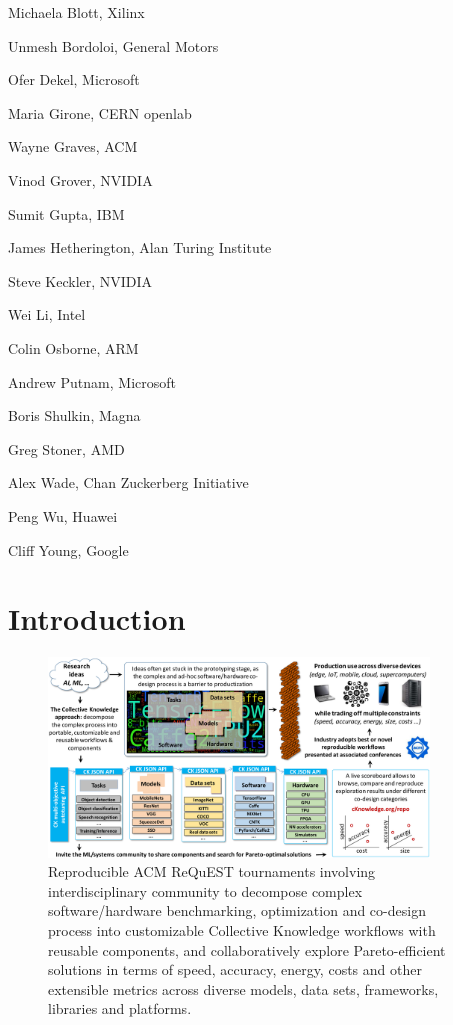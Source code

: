 \documentclass[10pt,onecolumn]{article}
\newenvironment{packed_itemize}{
\begin{itemize}
  \setlength{\itemsep}{1pt}
  \setlength{\parskip}{0pt}
  \setlength{\parsep}{0pt}
}{\end{itemize}}
\begin{document}
\begin{packed_itemize}

 \item Michaela Blott, Xilinx
 \item Unmesh Bordoloi, General Motors
 \item Ofer Dekel, Microsoft
 \item Maria Girone, CERN openlab
 \item Wayne Graves, ACM
 \item Vinod Grover, NVIDIA
 \item Sumit Gupta, IBM
 \item James Hetherington, Alan Turing Institute
 \item Steve Keckler, NVIDIA
 \item Wei Li, Intel
 \item Colin Osborne, ARM
 \item Andrew Putnam, Microsoft
 \item Boris Shulkin, Magna
 \item Greg Stoner, AMD
 \item Alex Wade, Chan Zuckerberg Initiative
 \item Peng Wu, Huawei
 \item Cliff Young, Google 

\end{packed_itemize}

\newpage

\section*{Introduction}
\label{sec:intro}

\begin{figure}[ht]
  \centering
  \includegraphics[width=0.9\textwidth]{figures/ck-request-concept-cropped.pdf}
  \caption{Reproducible ACM ReQuEST tournaments involving interdisciplinary community
  to decompose complex software/hardware benchmarking,
  optimization and co-design process into customizable
  Collective Knowledge workflows with reusable components, and collaboratively
  explore Pareto-efficient solutions in terms of speed,
  accuracy, energy, costs and other extensible metrics
  across diverse models, data sets, frameworks, libraries and platforms.}
  \label{fig:ck-request-concept}
\end{figure}
\end{document}
